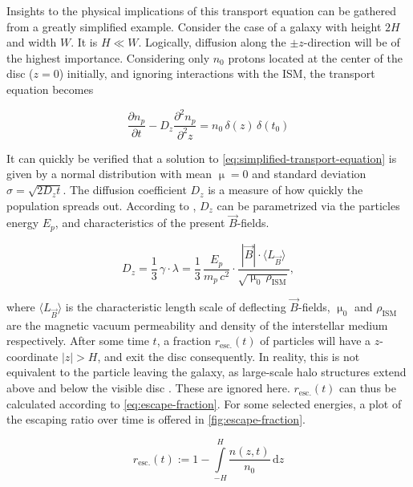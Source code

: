 Insights to the physical implications of this transport equation can be gathered from a greatly simplified example. Consider the case of a galaxy with height $2H$ 
and width $W$. It is $H \ll W$. Logically, diffusion along the $\pm z$-direction will be of the highest importance. Considering only $n_0$ protons located at the 
center of the disc ($z=0$) initially, and ignoring interactions with the ISM, the transport equation becomes 

\begin{equation}
\label{eq:simplified-transport-equation}
\frac{\partial n_p}{\partial t} - D_z \frac{\partial^2 n_p}{\partial^2 z} = n_0\,\delta(z)\,\delta(t_0)
\end{equation}

It can quickly be verified that a solution to \autoref{eq:simplified-transport-equation} is given by a normal distribution with mean $\upmu = 0$ and standard 
deviation $\sigma = \sqrt{2D_zt}$. The diffusion coefficient $D_z$ is a measure of how quickly the population spreads out. According to  
\cite{skilling1970diffusion}, $D_z$ can be parametrized via the particles energy $E_p$, and characteristics of the present $\vec{B}$-fields.

\begin{equation}
	\label{eq:diffusion-coefficient}
	D_z = \frac{1}{3}\,\gamma\cdot\lambda =\frac{1}{3}\,\frac{E_p}{m_p\,c^2}\cdot\frac{|\vec{B}|\cdot\langle L_{\vec{B}}\rangle}{\sqrt{\upmu_0\,\rho_\text{ISM}}},
\end{equation}

where $\langle L_{\vec{B}} \rangle$ is the characteristic length scale of deflecting $\vec{B}$-fields, $\upmu_0$ and $\rho_\text{ISM}$ are the magnetic vacuum 
permeability and density of the interstellar medium respectively. After some time $t$, a fraction $r_\text{esc.}(t)$ of particles will have a $z$-coordinate 
$|z| > H$, and exit the disc consequently. In reality, this is not equivalent to the particle leaving the galaxy, as large-scale halo structures extend above and 
below the visible disc \cite{searle1978compositions}. These are ignored here. $r_\text{esc.}(t)$ can thus be calculated according to \autoref{eq:escape-fraction}.
For some selected energies, a plot of the escaping ratio over time is offered in \autoref{fig:escape-fraction}.

\begin{equation}
\label{eq:escape-fraction}
r_\text{esc.}(t) := 1 - \int\limits_{-H}^{H} \frac{n(z,t)}{n_0}\,\text{d}z
\end{equation}

